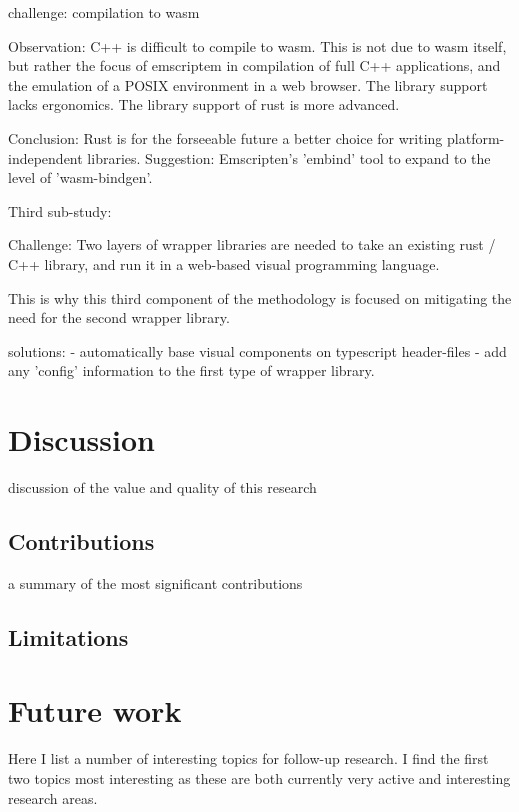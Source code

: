 challenge: 
compilation to wasm

Observation: 
C++ is difficult to compile to wasm.
This is not due to wasm itself, but rather the focus of emscriptem in compilation of full C++ applications, and the emulation of a POSIX environment in a web browser. 
The library support lacks ergonomics.
The library support of rust is more advanced.

Conclusion: 
Rust is for the forseeable future a better choice for writing platform-independent libraries. 
Suggestion: Emscripten's 'embind' tool to expand to the level of 'wasm-bindgen'.

Third sub-study: 

Challenge:
Two layers of wrapper libraries are needed to take an existing rust / C++ library, and run it in a web-based visual programming language.

This is why this third component of the methodology is focused on mitigating the need for the second wrapper library. 

solutions: 
- automatically base visual components on typescript header-files
- add any 'config' information to the first type of wrapper library. 


\section{Discussion}
\label{sec:discussion}

discussion of the value and quality of this research

\subsection{Contributions}
\label{sec:contribution}

a summary of the most significant contributions


\subsection{Limitations}
\label{sec:limitations}

\section{Future work}
\label{sec:future-work}

Here I list a number of interesting topics for follow-up research. 
I find the first two topics most interesting as these are both currently very active and interesting research areas.


